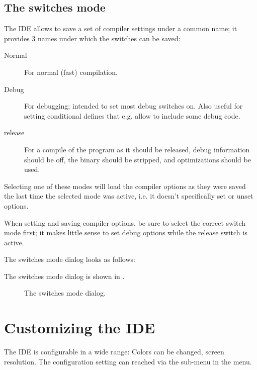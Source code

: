 \subsection{The switches mode}
\label{se:compilermode}
The IDE allows to save a set of compiler settings under a common name; it
provides 3 names under which the switches can be saved:
\begin{description}
\item[Normal] For normal (fast) compilation.
\item[Debug] For debugging; intended to set most debug switches on. Also
useful for setting conditional defines that e.g. allow to include some
debug code.
\item[release] For a compile of the program as it should be released, debug
information should be off, the binary should be stripped, and optimizations
should be used.
\end{description}
Selecting one of these modes will load the compiler options as they were
saved the last time the selected mode was active, i.e. it doesn't
specifically set or unset options. 

When setting and saving compiler options, be sure to select the correct
switch mode first; it makes little sense to set debug options while the
release switch is active.

\begin{htmlonly}
The switches mode dialog looks as follows:
\end{htmlonly}
\begin{latexonly}
The switches mode dialog is shown in .
\begin{figure}[ht]
\begin{center}
\caption{The switches mode dialog.}\label{fig:oswitch}
\ifpdf
{}
\else
{}
\fi
\end{center}
\end{figure}
\end{latexonly}

\section{Customizing the IDE}
The IDE is configurable in a wide range: Colors can be changed, screen
resolution. The configuration setting can reached via the
sub-menu  in the  menu.
%
%
